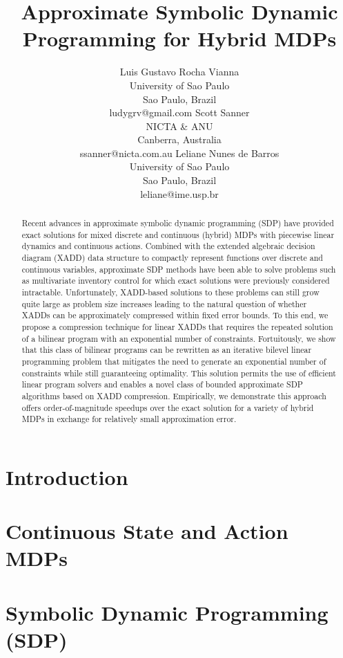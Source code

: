 \documentclass{article}
\title{	Approximate Symbolic Dynamic Programming for Hybrid MDPs }
\author{Luis Gustavo Rocha Vianna\\
University of Sao Paulo\\
Sao Paulo, Brazil\\
ludygrv@gmail.com
\And
Scott Sanner\\
NICTA \& ANU\\
Canberra, Australia\\
ssanner@nicta.com.au
\And
Leliane Nunes de Barros\\
University of Sao Paulo\\
Sao Paulo, Brazil\\
leliane@ime.usp.br}
\begin{document}
\maketitle

\begin{abstract}
Recent advances in approximate symbolic dynamic programming (SDP) have 
provided exact solutions for mixed discrete and continuous (hybrid) 
MDPs with piecewise linear dynamics and continuous actions. Combined 
with the extended algebraic decision diagram (XADD) data structure to 
compactly represent functions over discrete and continuous variables, 
approximate SDP methods have been able to solve problems such as 
multivariate inventory control for which exact solutions were 
previously considered intractable. Unfortunately, XADD-based 
solutions to these problems can still grow quite large as problem size 
increases leading to the natural question of whether XADDs can be 
approximately compressed within fixed error bounds. To this end, we 
propose a compression technique for linear XADDs that requires the 
repeated solution of a bilinear program with an exponential number of 
constraints. Fortuitously, we show that this class of bilinear 
programs can be rewritten as an iterative bilevel linear programming 
problem that mitigates the need to generate an exponential number of 
constraints while still guaranteeing optimality. This solution 
permits the use of efficient linear program solvers and enables a 
novel class of bounded approximate SDP algorithms based on XADD 
compression. Empirically, we demonstrate this approach offers 
order-of-magnitude speedups over the exact solution for a variety of 
hybrid MDPs in exchange for relatively small approximation error.
\end{abstract}

\section{Introduction}



\section{Continuous State and Action MDPs}



\section{Symbolic Dynamic Programming (SDP)}
\end{document}
